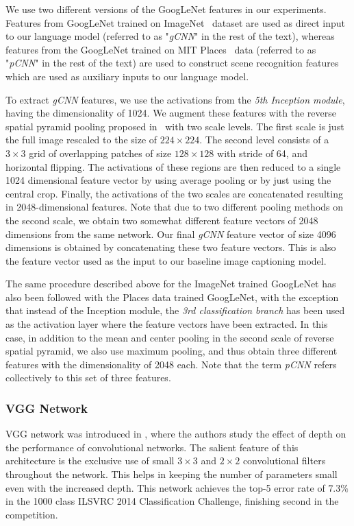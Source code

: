 We use two different versions of the GoogLeNet features in our experiments.
Features from GoogLeNet trained on ImageNet~\cite{ImagenetOrig} dataset are used
as direct input to our language model (referred to as "\emph{gCNN}" in the rest
of the text), whereas features from the GoogLeNet trained on MIT
Places~\cite{Zhou2014NIPS} data (referred to as "\emph{pCNN}" in the rest of the
text) are used to construct scene recognition features which are used as
auxiliary inputs to our language model.

To extract \emph{gCNN} features, we use the activations from the
\emph{5th Inception module}, having the dimensionality of 1024.
We augment these features with the reverse spatial pyramid pooling proposed
in~\cite{Gong2014} with two scale levels.
The first scale is just the full image rescaled to the size of $224\times224$.
The second level consists of a $3\times3$ grid of overlapping patches of size
$128\times128$ with stride of 64, and horizontal flipping.
The activations of these regions are then reduced to a single 1024 dimensional
feature vector by using average pooling or by just using the central crop.
Finally, the activations of the two scales are concatenated resulting in
2048-dimensional features.
Note that due to two different pooling methods on the second scale, we obtain
two somewhat different feature vectors of 2048 dimensions from the same network.
Our final \emph{gCNN} feature vector of size 4096 dimensions is obtained by
concatenating these two feature vectors.
This is also the feature vector used as the input to our baseline image
captioning model. 

The same procedure described above for the ImageNet trained GoogLeNet has
also been followed with the Places data trained GoogLeNet, with the exception
that instead of the Inception module, the \emph{3rd classification branch} has
been used as the activation layer where the feature vectors have been extracted.
In this case, in addition to the mean and center pooling in the second scale of
reverse spatial pyramid, we also use maximum pooling, and thus obtain three
different features with the dimensionality of 2048 each.
Note that the term \emph{pCNN} refers collectively to this set of three features.

\subsubsection{VGG Network} 
VGG network was introduced in \cite{Simonyan14c}, where the authors study the
effect of depth on the performance of convolutional networks.
The salient feature of this architecture is the exclusive use of small $3\times3$ and
$2\times2$ convolutional filters throughout the network.
This helps in keeping the number of parameters small even with the increased depth.
This network achieves the top-5 error rate of $7.3\%$ in the 1000 class ILSVRC
2014 Classification Challenge, finishing second in the competition.


